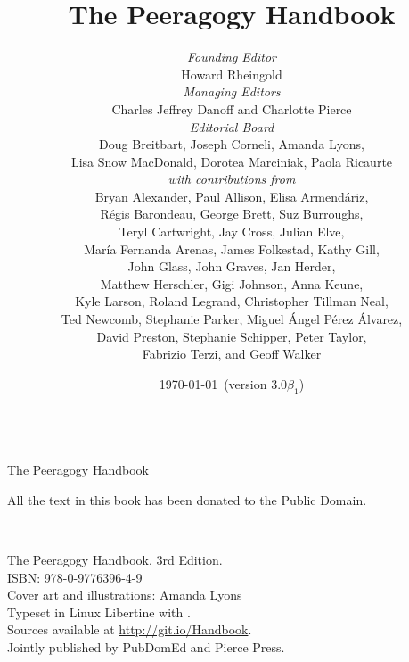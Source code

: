 \documentclass[ebook, 12pt, twoside]{memoir}
\begin{document}
\sloppy \pagestyle{empty} \thispagestyle{empty}
\begin{center}
\quad\\[1in] 
{\LARGE The Peeragogy Handbook}
\end{center}
\clearpage\mbox{}\clearpage    %
\title{The Peeragogy Handbook\\[.5in]}
\author{
\emph{Founding Editor}\\
{\small Howard Rheingold}\\[.3in]

\emph{Managing Editors}\\
{\small Charles Jeffrey Danoff and Charlotte Pierce} \\[.25in]

\emph{Editorial Board}\\
{\small Doug Breitbart, Joseph Corneli, Amanda Lyons,}\\
{\small Lisa Snow MacDonald, Dorotea Marciniak, Paola Ricaurte} \\[.25in]

\emph{with contributions from} \\
{\small Bryan Alexander, Paul Allison, Elisa Armend\'ariz,} \\
{\small R\'egis Barondeau, George Brett, Suz Burroughs,}\\ 
{\small Teryl Cartwright, Jay Cross, Julian Elve,}\\
{\small Mar\'ia Fernanda Arenas, James Folkestad, Kathy Gill,}\\
{\small John Glass, John Graves, Jan Herder,} \\
{\small Matthew Herschler, Gigi Johnson, Anna Keune,} \\
{\small Kyle Larson, Roland Legrand, Christopher Tillman Neal,} \\
{\small Ted Newcomb, Stephanie Parker, Miguel \'Angel P\'erez \'Alvarez,} \\
{\small David Preston, Stephanie Schipper, Peter Taylor,} \\
{\small Fabrizio Terzi, and Geoff Walker}
}
\date{\today\ (version 3.0$\beta_1$)}
\maketitle
\thispagestyle{empty}

\begin{center}
{\large All the text in this book has been donated to the Public Domain.}
\end{center}
\quad \\[4in] 
\begin{center}
\large{The Peeragogy Handbook, 3rd Edition.\\
ISBN: 978-0-9776396-4-9}
\quad \\[.2in] 
\large{Cover art and illustrations: Amanda Lyons}
\quad \\[.2in]
\large{Typeset in Linux Libertine with \XeLaTeX. \\
Sources available at \url{http://git.io/Handbook}.}
\quad \\[.2in]
\large{Jointly published by PubDomEd and Pierce Press.}
\end{center}
\thispagestyle{empty}
\clearpage
\end{document}
